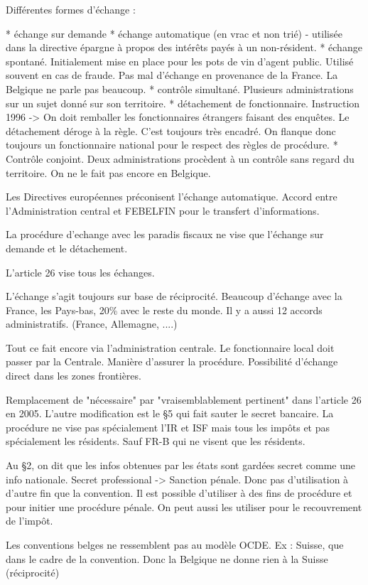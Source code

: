 \documentclass{book}
\begin{document}
Différentes formes d'échange :

* échange sur demande 
* échange automatique (en vrac et non trié) - utilisée dans la directive épargne à propos des intérêts payés à un non-résident.
* échange spontané. Initialement mise en place pour les pots de vin d'agent public. Utilisé souvent en cas de fraude. Pas mal d'échange en provenance de la France. La Belgique ne parle pas beaucoup.
* contrôle simultané. Plusieurs administrations sur un sujet donné sur son territoire.
* détachement de fonctionnaire.  Instruction 1996 -> On doit remballer les fonctionnaires étrangers faisant des enquêtes. Le détachement déroge à la règle. C'est toujours très encadré. On flanque donc toujours un fonctionnaire national pour le respect des règles de procédure.
* Contrôle conjoint. Deux administrations procèdent à un contrôle sans regard du territoire. On ne le fait pas encore en Belgique.
 
Les Directives européennes préconisent l'échange automatique. Accord entre l'Administration central et FEBELFIN
 pour le transfert d'informations.

La procédure d'echange avec les paradis fiscaux ne vise que l'échange sur demande et le détachement.

L'article 26 vise tous les échanges. 

L'échange s'agit toujours sur base de réciprocité. Beaucoup d'échange avec la France, les Pays-bas, 20\% avec le reste du monde. Il y a aussi 12 accords administratifs. (France, Allemagne, ....)

Tout ce fait encore via l'administration centrale. Le fonctionnaire local doit passer par la Centrale. Manière d'assurer la procédure. Possibilité d'échange direct dans les zones frontières.

Remplacement de "nécessaire" par "vraisemblablement pertinent" dans l'article 26 en 2005. L'autre modification est le §5 qui fait sauter le secret bancaire. La procédure ne vise pas spécialement l'IR et ISF mais tous les impôts et pas spécialement les résidents. Sauf FR-B qui ne visent que les résidents.

Au §2, on dit que les infos obtenues par les états sont gardées secret comme une info nationale. Secret professional -> Sanction pénale. Donc pas d'utilisation à d'autre fin que la convention. Il est possible d'utiliser à des fins de procédure et pour initier une procédure pénale. On peut aussi les utiliser pour le recouvrement de l'impôt.

Les conventions belges ne ressemblent pas au modèle OCDE. Ex : Suisse, que dans le cadre de la convention. Donc la Belgique ne donne rien à la Suisse (réciprocité)
\end{document}
